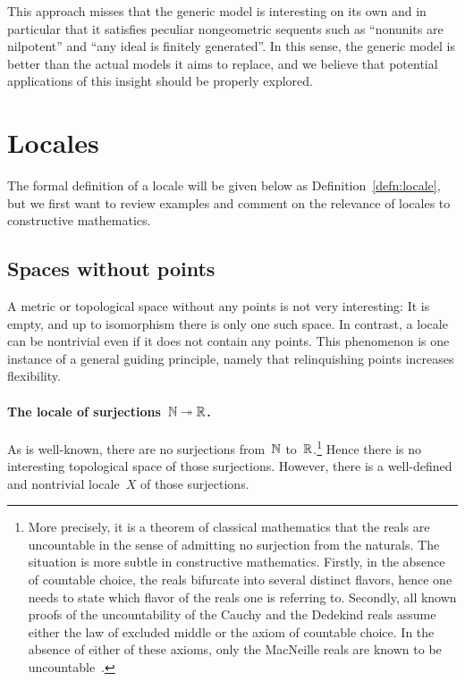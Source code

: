 \documentclass{ws-rv9x6}
\begin{document}
{{This approach misses that the generic model is interesting on its own and in
particular that it satisfies peculiar nongeometric sequents such as ``nonunits
are nilpotent'' and ``any ideal is \notnot finitely generated''. In this sense,
the generic model is better than the actual models it aims to replace, and we
believe that potential applications of this insight should be properly
explored.}


\section{Locales}
\label{sect:locales}

The formal definition of a locale will be given below as
Definition~\ref{defn:locale}, but we first want to review examples and comment on
the relevance of locales to constructive mathematics.

\subsection{Spaces without points}
\label{sect:examples-no-points}

A metric or topological space without any points is not very interesting: It is
empty, and up to isomorphism there is only one such space. In contrast, a
locale can be nontrivial even if it does not contain any points. This
phenomenon is one instance of a general guiding principle, namely that relinquishing
points increases flexibility.

\paragraph{The locale of surjections~$\mathbb{N} \twoheadrightarrow \mathbb{R}$.} As is
well-known, there are no surjections from~$\mathbb{N}$ to~$\mathbb{R}$.\footnote{More
precisely, it is a theorem of classical mathematics that the reals are
uncountable in the sense of admitting no surjection from the naturals. The
situation is more subtle in constructive mathematics. Firstly, in the absence
of countable choice, the reals bifurcate into several distinct flavors, hence
one needs to state which flavor of the reals one is referring to. Secondly, all
known proofs of the uncountability of the Cauchy and the Dedekind reals assume
either the law of excluded middle or the axiom of countable choice. In the
absence of either of these axioms, only the MacNeille reals are known to be
uncountable~\cite{blechschmidt-hutzler:macneille}.} Hence there is no
interesting topological space of those surjections. However, there is a
well-defined and nontrivial locale~$X$ of those surjections.

}
\end{document}
